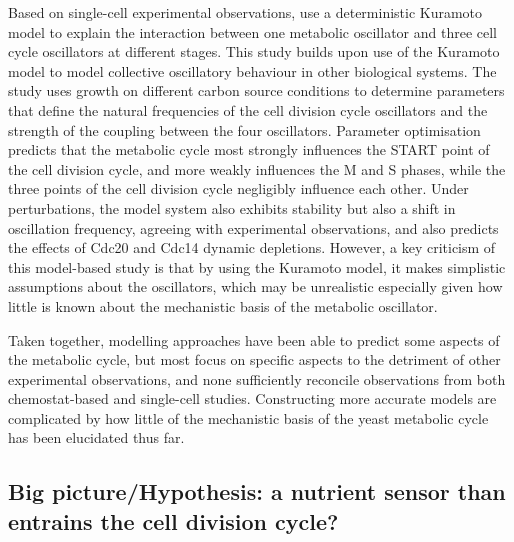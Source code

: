 Based on single-cell experimental observations, \citet{ozsezenInferenceHighLevelInteraction2019} use a deterministic Kuramoto model to explain the interaction between one metabolic oscillator and three cell cycle oscillators at different stages.
This study builds upon use of the Kuramoto model to model collective oscillatory behaviour in other biological systems.
The study uses growth on different carbon source conditions to determine parameters that define the natural frequencies of the cell division cycle oscillators and the strength of the coupling between the four oscillators.
Parameter optimisation predicts that the metabolic cycle most strongly influences the START point of the cell division cycle, and more weakly influences the M and S phases, while the three points of the cell division cycle negligibly influence each other.
Under perturbations, the model system also exhibits stability but also a shift in oscillation frequency, agreeing with experimental observations, and also predicts the effects of Cdc20 and Cdc14 dynamic depletions.
However, a key criticism of this model-based study is that by using the Kuramoto model, it makes simplistic assumptions about the oscillators, which may be unrealistic especially given how little is known about the mechanistic basis of the metabolic oscillator.


Taken together, modelling approaches have been able to predict some aspects of the metabolic cycle, but most focus on specific aspects to the detriment of other experimental observations, and none sufficiently reconcile observations from both chemostat-based and single-cell studies.
Constructing more accurate models are complicated by how little of the mechanistic basis of the yeast metabolic cycle has been elucidated thus far.

\subsection{Big picture/Hypothesis: a nutrient sensor than entrains the cell division cycle?}
\label{subsec:intro-ymc-hypothesis}

